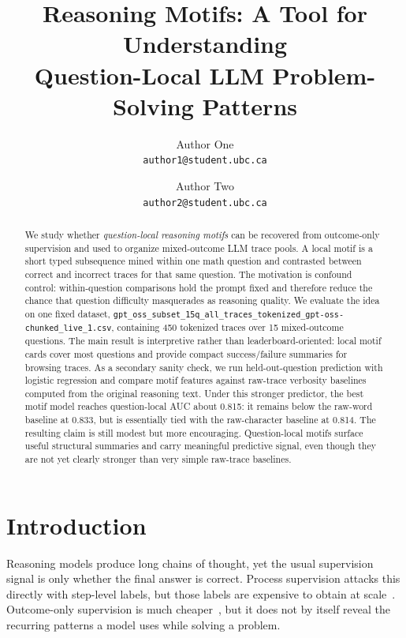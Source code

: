 \documentclass[11pt]{article}
\title{\vspace{-1.1em}\textbf{Reasoning Motifs: A Tool for Understanding\\
Question-Local LLM Problem-Solving Patterns}\vspace{-0.5em}}
\author{%
  Author One\\\texttt{author1@student.ubc.ca}
  \and
  Author Two\\\texttt{author2@student.ubc.ca}
}
\date{}
\begin{document}
\maketitle
\thispagestyle{plain}
\renewcommand{\thefootnote}{}
\renewcommand{\thefootnote}{\arabic{footnote}}\setcounter{footnote}{0}

\begin{abstract}
\noindent We study whether \emph{question-local reasoning motifs} can be recovered from outcome-only supervision and used to organize mixed-outcome LLM trace pools. A local motif is a short typed subsequence mined within one math question and contrasted between correct and incorrect traces for that same question. The motivation is confound control: within-question comparisons hold the prompt fixed and therefore reduce the chance that question difficulty masquerades as reasoning quality. We evaluate the idea on one fixed dataset, \texttt{gpt\_oss\_subset\_15q\_all\_traces\_tokenized\_gpt-oss-chunked\_live\_1.csv}, containing 450 tokenized traces over 15 mixed-outcome questions. The main result is interpretive rather than leaderboard-oriented: local motif cards cover most questions and provide compact success/failure summaries for browsing traces. As a secondary sanity check, we run held-out-question prediction with logistic regression and compare motif features against raw-trace verbosity baselines computed from the original reasoning text. Under this stronger predictor, the best motif model reaches question-local AUC about 0.815: it remains below the raw-word baseline at 0.833, but is essentially tied with the raw-character baseline at 0.814. The resulting claim is still modest but more encouraging. Question-local motifs surface useful structural summaries and carry meaningful predictive signal, even though they are not yet clearly stronger than very simple raw-trace baselines.
\end{abstract}

\section{Introduction}

Reasoning models produce long chains of thought, yet the usual supervision signal is only whether the final answer is correct. Process supervision attacks this directly with step-level labels, but those labels are expensive to obtain at scale~\citep{lightman2023verify,wang2024mathshepherd}. Outcome-only supervision is much cheaper~\citep{deepseek-r1}, but it does not by itself reveal the recurring patterns a model uses while solving a problem.
\end{document}
